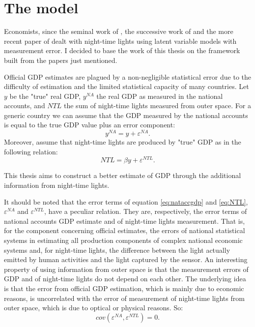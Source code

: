 \chapter{The model}\label{ch:model}

Economists, since the seminal work of \cite{chen2011using}, the successive work of \cite{henderson2012measuring} and the more recent paper of \cite{hu2022illuminating} dealt with night-time lights using latent variable models with measurement error. I decided to base the work of this thesis on the framework built from the papers just mentioned.

Official GDP estimates are plagued by a non-negligible statistical error due to the difficulty of estimation and the limited statistical capacity of many countries. Let $y$ be the "true" real GDP, $y^{NA}$ the real GDP as measured in the national accounts, and $NTL$ the sum of night-time lights measured from outer space. For a generic country we can assume that the GDP measured by the national accounts is equal to the true GDP value plus an error component:
\begin{equation}
    y^{NA}=y+\varepsilon^{NA}.
    \label{eq:nataccgdp}
\end{equation}
Moreover, assume that night-time lights are produced by "true" GDP as in the following relation:
\begin{equation}
    NTL=\beta y+\varepsilon^{NTL}.
    \label{eq:NTL}
\end{equation}

This thesis aims to construct a better estimate of GDP through the additional information from night-time lights.

It should be noted that the error terms of equation \ref{eq:nataccgdp} and \ref{eq:NTL}, $\varepsilon^{NA}$ and $\varepsilon^{NTL}$, have a peculiar relation.
They are, respectively, the error terms of national accounts GDP estimate and of night-time lights measurement. That is, for the component concerning official estimates, the errors of national statistical systems in estimating all production components of complex national economic systems and, for night-time lights, the difference between the light actually emitted by human activities and the light captured by the sensor. An interesting property of using information from outer space is that the measurement errors of GDP and of night-time lights do not depend on each other. The underlying idea is that the error from official GDP estimation, which is mainly due to economic reasons, is uncorrelated with the error of measurement of night-time lights from outer space, which is due to optical or physical reasons.
So:
\begin{equation}
    \label{eq:assumption}
    cov(\varepsilon^{NA}, \varepsilon^{NTL})=0.
\end{equation}

